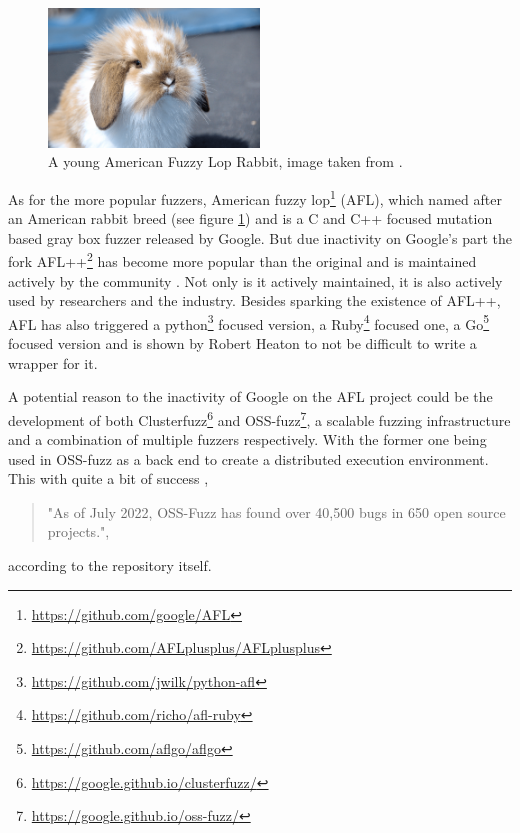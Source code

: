\begin{figure}
	\centering
	\includegraphics[width=0.5\textwidth]{images/AFLBunny}
	\caption{A young American Fuzzy Lop Rabbit, image taken from \cite{AFLBunny}.}
	\label{fig:AFLbunny}
\end{figure}

As for the more popular fuzzers, American fuzzy lop\footnote{\url{https://github.com/google/AFL}} (AFL), which named after an American rabbit breed (see figure \ref{fig:AFLbunny}) and is a C and C++ focused mutation based gray box fuzzer released by Google. But due inactivity on Google's part the fork AFL++\footnote{\url{https://github.com/AFLplusplus/AFLplusplus}} has become more popular than the original and is maintained actively by the community \cite{27AFL++}. Not only is it actively maintained, it is also actively used by researchers and the industry. Besides sparking the existence of AFL++, AFL has also triggered a python\footnote{\url{https://github.com/jwilk/python-afl}} focused version, a Ruby\footnote{\url{https://github.com/richo/afl-ruby}} focused one, a Go\footnote{\url{https://github.com/aflgo/aflgo}} focused version and is shown by Robert Heaton \cite{AFLWrapper} to not be difficult to write a wrapper for it.

A potential reason to the inactivity of Google on the AFL project could be the development of both Clusterfuzz\footnote{\url{https://google.github.io/clusterfuzz/}} and OSS-fuzz\footnote{\url{https://google.github.io/oss-fuzz/}}, a scalable fuzzing infrastructure and a combination of multiple fuzzers respectively. With the former one being used in OSS-fuzz as a back end to create a distributed execution environment. This with quite a bit of success \cite{31OSS-FuzzBugs},
\begin{quote} 
	"As of July 2022, OSS-Fuzz has found over 40,500 bugs in 650 open source projects.",
\end{quote} according to the repository itself. 

